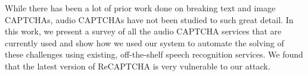 While there has been a lot of prior work done on breaking text and image CAPTCHAs, audio CAPTCHAs have not been studied to such great detail. In this work, we present a survey of all the audio CAPTCHA services that are currently used and show how we used our system to automate the solving of these challenges using existing, off-the-shelf speech recognition services. We found that the latest version of ReCAPTCHA is very vulnerable to our attack.\newline

  


